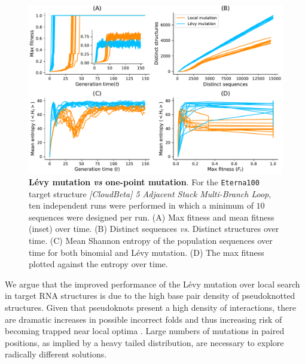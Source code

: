 \begin{figure}[t!]
	\centering
	\includegraphics[width=1.0\linewidth]{../res/images/arnaque/fig8.pdf}
	\small 
	\caption{\textbf{Lévy mutation \emph{vs} one-point mutation}. For the \texttt{Eterna100} target structure \textit{[CloudBeta] 5 Adjacent Stack Multi-Branch Loop}, ten independent runs were performed in which a minimum of $10$ sequences were designed per run.  (A) Max fitness and mean fitness (inset) over time. (B) Distinct sequences \emph{vs.} Distinct structures over time. (C) Mean Shannon entropy of the population sequences over time for both binomial and Lévy mutation. (D) The max fitness plotted against the entropy over time.}
	\label{Fig:diversity}
	
\end{figure}


We argue that the improved performance of the Lévy mutation over local search in target RNA structures is due to the high base pair density of pseudoknotted structures. Given that pseudoknots present a high density of interactions, there are dramatic increases in possible incorrect folds and thus increasing risk of becoming trapped near local optima \cite{hajdin2013accurate}. Large numbers of mutations in paired positions, as implied by a heavy tailed distribution, are necessary to explore radically different solutions. 

